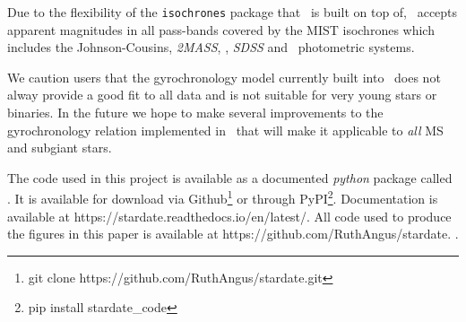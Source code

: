 Due to the flexibility of the {\tt isochrones} package that \sd\ is built on
top of, \sd\ accepts apparent magnitudes in all pass-bands covered by the MIST
isochrones which includes the Johnson-Cousins, {\it 2MASS}, \Kepler, {\it
SDSS} and \Gaia\ photometric systems.

We caution users that the gyrochronology model currently built into \sd\ does
not alway provide a good fit to all data and is not suitable for very young
stars or binaries.
In the future we hope to make several improvements to the gyrochronology
relation implemented in \sd\ that will make it applicable to {\it all} MS and
subgiant stars.

The code used in this project is available as a documented {\it python}
package called \sd.
It is available for download via Github\footnote{git clone
https://github.com/RuthAngus/stardate.git} or through
PyPI\footnote{pip install stardate\_code}.
Documentation is available at https://stardate.readthedocs.io/en/latest/.
All code used to produce the figures in this paper is available at
https://github.com/RuthAngus/stardate.
.
